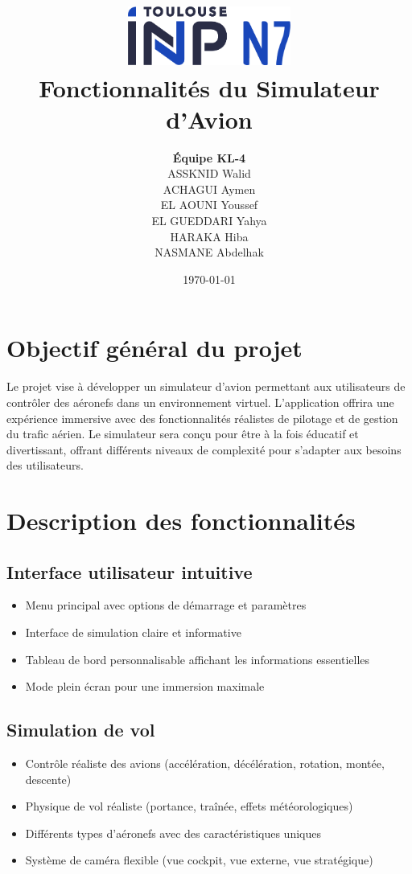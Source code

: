 \documentclass[12pt,a4paper]{article}
\title{
    \includegraphics[width=0.4\textwidth]{n7.png}\\[1cm]
    \Huge\textbf{Fonctionnalités du Simulateur d'Avion}
}
\author{
    \Large\textbf{Équipe KL-4}\\[2ex]
    \large
    ASSKNID Walid\\
    ACHAGUI Aymen\\
    EL AOUNI Youssef\\
    EL GUEDDARI Yahya\\
    HARAKA Hiba\\
    NASMANE Abdelhak
}
\date{\today}
\begin{document}
\maketitle
\thispagestyle{empty}
\newpage

\tableofcontents
\newpage

\section{Objectif général du projet}
Le projet vise à développer un simulateur d'avion permettant aux utilisateurs de contrôler des aéronefs dans un environnement virtuel. L'application offrira une expérience immersive avec des fonctionnalités réalistes de pilotage et de gestion du trafic aérien. Le simulateur sera conçu pour être à la fois éducatif et divertissant, offrant différents niveaux de complexité pour s'adapter aux besoins des utilisateurs.

\section{Description des fonctionnalités}

\subsection{Interface utilisateur intuitive}
\begin{itemize}
    \item Menu principal avec options de démarrage et paramètres
    \item Interface de simulation claire et informative
    \item Tableau de bord personnalisable affichant les informations essentielles
    \item Mode plein écran pour une immersion maximale
\end{itemize}

\subsection{Simulation de vol}
\begin{itemize}
    \item Contrôle réaliste des avions (accélération, décélération, rotation, montée, descente)
    \item Physique de vol réaliste (portance, traînée, effets météorologiques)
    \item Différents types d'aéronefs avec des caractéristiques uniques
    \item Système de caméra flexible (vue cockpit, vue externe, vue stratégique)
\end{itemize}
\end{document}
